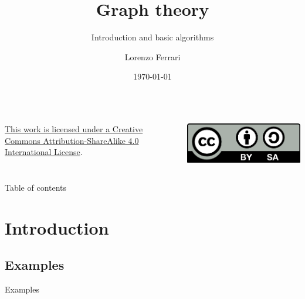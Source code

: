 \documentclass[compress]{beamer}
\title{Graph theory}
\subtitle{Introduction and basic algorithms}
\author{Lorenzo Ferrari}
\institute{Campus Bornholm}
\date{\today}
\begin{document}
\begin{frame}
  \maketitle
  \begin{columns}
    \begin{flushleft}
      \small{\href{https://creativecommons.org/licenses/by-sa/4.0/}{This work is licensed under a Creative Commons Attribution-ShareAlike 4.0 International License}.}
    \end{flushleft}
    \begin{flushright}
      \includegraphics[scale=0.7]{pics/by-sa.png}
    \end{flushright}
  \end{columns}
\end{frame}

\begin{frame}{Table of contents}
  \tableofcontents
\end{frame}


\section{Introduction}

\subsection{Examples}

\begin{frame}{Examples}
  \begin{columns}
    \begin{center}
    \scalebox{0.7}{}
    \end{center}
    \begin{center}
    \scalebox{0.7}{}
    \end{center}
    \begin{center}
    \scalebox{0.7}{}
    \end{center}
    \begin{center}
    \scalebox{0.7}{}
    \end{center}
  \end{columns}
\end{frame}
\end{document}
